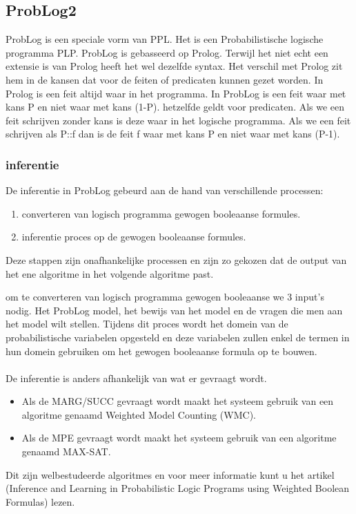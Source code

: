 \documentclass[12pt,a4paper,oneside]{book}
\begin{document}
\subsection{ProbLog2}
\label{subsec:problog2}
ProbLog is een speciale vorm van PPL. Het is een Probabilistische logische programma PLP. 
ProbLog is gebasseerd op Prolog. Terwijl het niet echt een extensie is van Prolog heeft het wel dezelfde syntax. Het verschil met Prolog zit hem in de kansen dat voor de feiten of predicaten kunnen gezet worden. In Prolog is een feit altijd waar in het programma. In ProbLog is een feit waar met kans P en niet waar met kans (1-P). hetzelfde geldt voor predicaten. Als we een feit schrijven zonder kans is deze waar in het logische programma. Als we een feit schrijven als P::f dan is de feit f waar met kans P en niet waar met kans (P-1). 

\subsubsection{inferentie}
De inferentie in ProbLog gebeurd aan de hand van verschillende processen:
\begin{enumerate}
	\item converteren van logisch programma gewogen booleaanse formules.
	\item inferentie proces op de gewogen booleaanse formules.
\end{enumerate}
Deze stappen zijn onafhankelijke processen en zijn zo gekozen dat de output van het ene algoritme in het volgende algoritme past.

om te converteren van logisch programma gewogen booleaanse we 3 input's nodig. Het ProbLog model, het bewijs van het model en de vragen die men aan het model wilt stellen. Tijdens dit proces wordt het domein van de probabilistische variabelen opgesteld en deze variabelen zullen enkel de termen in hun domein gebruiken om het gewogen booleaanse formula op te bouwen.
\\\\
De inferentie is anders afhankelijk van wat er gevraagt wordt.
\begin{itemize}
	\item Als de MARG/SUCC gevraagt wordt maakt het systeem gebruik van een algoritme genaamd Weighted Model Counting (WMC).
	\item Als de MPE gevraagt wordt maakt het systeem gebruik van een algoritme genaamd MAX-SAT.
\end{itemize}
Dit zijn welbestudeerde algoritmes en voor meer informatie kunt u het artikel (Inference and Learning in Probabilistic Logic Programs using Weighted Boolean Formulas) lezen.
\end{document}
